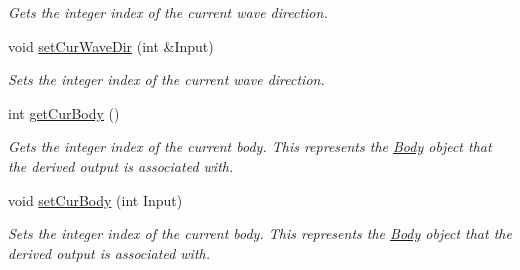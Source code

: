 \begin{DoxyCompactItemize}
\begin{DoxyCompactList}\small\item\em Gets the integer index of the current wave direction. \end{DoxyCompactList}\item 
void \hyperlink{class_output_derived_a174188431586c269edca5f17db16b498}{set\-Cur\-Wave\-Dir} (int \&Input)
\begin{DoxyCompactList}\small\item\em Sets the integer index of the current wave direction. \end{DoxyCompactList}\item 
int \hyperlink{class_output_derived_ac3a9e37f0f7bc0ac003d2662db3d17bb}{get\-Cur\-Body} ()
\begin{DoxyCompactList}\small\item\em Gets the integer index of the current body. This represents the \hyperlink{class_body}{Body} object that the derived output is associated with. \end{DoxyCompactList}\item 
void \hyperlink{class_output_derived_a56aa87d4a9aec5e21842bf614920c1dc}{set\-Cur\-Body} (int Input)
\begin{DoxyCompactList}\small\item\em Sets the integer index of the current body. This represents the \hyperlink{class_body}{Body} object that the derived output is associated with. \end{DoxyCompactList}\end{DoxyCompactItemize}
